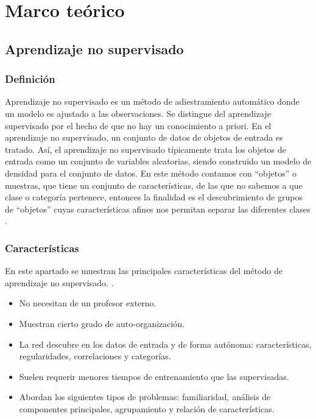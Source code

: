 \section{Marco teórico}
\subsection{Aprendizaje no supervisado}

\subsubsection{Definición}

Aprendizaje no supervisado es un método de adiestramiento automático donde un modelo es ajustado a las observaciones. Se distingue del  aprendizaje supervisado por el hecho de que no hay un conocimiento a priori. En el aprendizaje no supervisado, un conjunto de datos de objetos de entrada es tratado. Así, el aprendizaje no supervisado típicamente trata los objetos de entrada como un conjunto de variables aleatorias, siendo construido un modelo de densidad para el conjunto de datos.
\vskip 1cm
En este método contamos con “objetos” o muestras, que tiene un conjunto de características, de las que no sabemos a que clase o categoría pertenece, entonces la finalidad es el descubrimiento de grupos de “objetos” cuyas características afines nos permitan separar las diferentes clases \citep{Araujo}.

\subsubsection{Características}

En este apartado se muestran las principales características del método de aprendizaje no supervisado. \citep{Hinton_Sejnowski}.

\begin{itemize}
\item No necesitan de un profesor externo.
\item Muestran cierto grado de auto-organización.
\item La red descubre en los datos de entrada y de forma autónoma: características, regularidades, correlaciones y categorías.
\item Suelen requerir menores tiempos de entrenamiento que las supervisadas.
\item Abordan los siguientes tipos de problemas: familiaridad, análisis de componentes principales, agrupamiento y relación de características.
\end{itemize}

